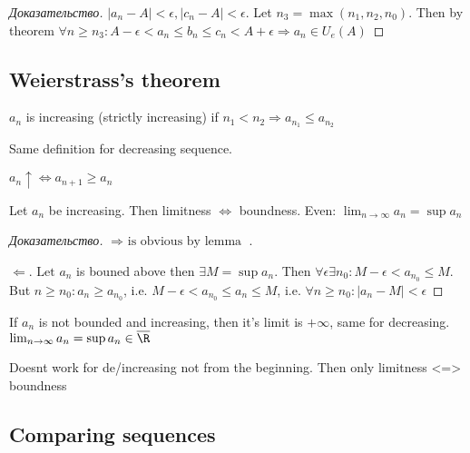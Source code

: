 \begin{proof}[Доказательство]
	$\left| a_n - A \right| < \epsilon, \left| c_n - A \right|  < \epsilon$. Let $n_3 = \max(n_1, n_2, n_0)$. Then by theorem $\forall n \geq n_3: A-\epsilon < a_n \leq b_n \leq c_n < A + \epsilon \Rightarrow a_n \in U_e (A)$
\end{proof}

\subsection{Weierstrass's theorem}

\begin{definition}[]
	$a_n$ is increasing (strictly increasing) if $n_1 < n_2 \Rightarrow a_{n_1} \leq a_{n_2}$

	Same definition for decreasing sequence.
\end{definition}

\begin{note}[]
	$a_n \uparrow \Leftrightarrow a_{n+1} \geq a_n$
\end{note}

\begin{theorem}[Weierstrass]
	Let $a_n$ be increasing. Then limitness $ \Leftrightarrow $ boundness. Even:  $\lim_{n \to \infty} a_n = \sup {a_n}$
\end{theorem}

\begin{proof}[Доказательство]
	$ \Rightarrow \text{ is obvious by lemma } $.

	$ \Leftarrow. \text{ Let } a_n$ is bouned above then $\exists M = \sup a_n$. Then $\forall \epsilon \exists n_0: M - \epsilon < a_{n_0} \leq M$. But $n \geq n_0: a_n \geq a_{n_0}$, i.e. $M-\epsilon < a_{n_0} \leq a_n \leq M$, i.e. $\forall  n \geq n_0: \left| a_n -M \right| < \epsilon$
\end{proof}

\begin{note}[]
	If $a_n$ is not bounded and increasing, then it's limit is $+\infty$, same for decreasing. $\lim_{n \to \infty} a_n = \sup a_n \in \overline{\R}$
\end{note}

\begin{note}[]
	Doesnt work for de/increasing not from the beginning. Then only limitness <=> boundness
\end{note}

\subsection{Comparing sequences}

